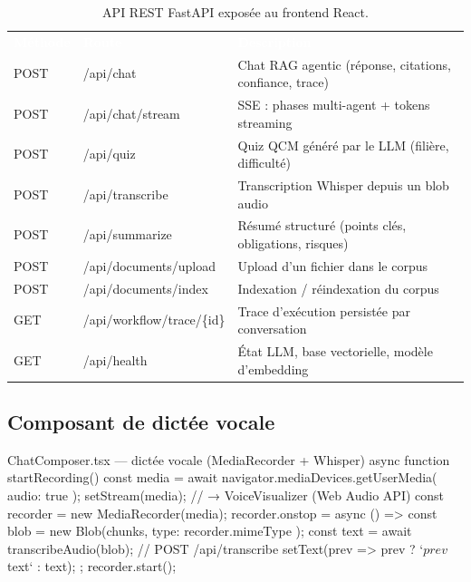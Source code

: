 \documentclass[11pt, a4paper]{article}
\begin{document}
\begin{table}[H]
    \centering
    \sffamily\footnotesize\renewcommand{\arraystretch}{1.25}
    \begin{tabularx}{\textwidth}{l l X}
        \toprule
        \rowcolor{mypurple}
        \textcolor{white}{\textbf{Méthode}} & \textcolor{white}{\textbf{Route}} & \textcolor{white}{\textbf{Description}} \\
        POST & /api/chat & Chat RAG agentic (réponse, citations, confiance, trace) \\
        \rowcolor{codegray}
        POST & /api/chat/stream & SSE : phases multi-agent + tokens streaming \\
        POST & /api/quiz & Quiz QCM généré par le LLM (filière, difficulté) \\
        \rowcolor{codegray}
        POST & /api/transcribe & Transcription Whisper depuis un blob audio \\
        POST & /api/summarize & Résumé structuré (points clés, obligations, risques) \\
        \rowcolor{codegray}
        POST & /api/documents/upload & Upload d'un fichier dans le corpus \\
        POST & /api/documents/index & Indexation / réindexation du corpus \\
        \rowcolor{codegray}
        GET  & /api/workflow/trace/\{id\} & Trace d'exécution persistée par conversation \\
        GET  & /api/health & État LLM, base vectorielle, modèle d'embedding \\
        \bottomrule
    \end{tabularx}
    \caption{API REST FastAPI exposée au frontend React.}
\end{table}

\subsection{Composant de dictée vocale}

\begin{vscodebox}{ChatComposer.tsx — dictée vocale (MediaRecorder + Whisper)}
async function startRecording() {
  const media = await navigator.mediaDevices.getUserMedia({ audio: true });
  setStream(media);            // → VoiceVisualizer (Web Audio API)
  const recorder = new MediaRecorder(media);
  recorder.onstop = async () => {
    const blob = new Blob(chunks, { type: recorder.mimeType });
    const text = await transcribeAudio(blob); // POST /api/transcribe
    setText(prev => prev ? `${prev} ${text}` : text);
  };
  recorder.start();
}
\end{vscodebox}
\end{document}
